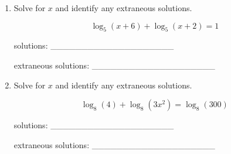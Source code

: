 \documentclass[11pt]{article}
\begin{document}
\begin{enumerate}
{{solutions: \(\boxed{ -1 }\)

extraneous solutions: \(\boxed{ \text{none} }\)

}
}

\newpage

% 

\item %
\providecommand{\stxKnowl}{}\renewcommand{\stxKnowl}[1]{#1}
\providecommand{\stxOuttro}{}\renewcommand{\stxOuttro}[1]{#1}
\providecommand{\stxTitle}{}\renewcommand{\stxTitle}[1]{#1}
\renewcommand{\stxOuttro}[1]{}
\stxKnowl{
Solve for \(x\) and identify any extraneous solutions.

\[\log_{5}(x + 6) + \log_{5}(x + 2) = 1\]

solutions: ____________________

extraneous solutions: ____________________

\stxOuttro{
Solution

\[\begin{aligned} \log_{5}((x + 6)(x + 2)) &= 1 \\ 5 &= (x + 6)(x + 2) \\ 5 &= x^{2} + 8 \, x + 12 \\ 0 &= x^{2} + 8 \, x + 7 \\ 0 &= (x + 1)(x + 7) \end{aligned}\]

 \(x = -1\) is a valid solution, while \(x = -7\) causes a non-positive argument in the original logarithms. 

solutions: \(\boxed{ x = -1 }\)

extraneous solutions: \(\boxed{ x = -7 }\)

}
}

\newpage

% 

\item %
\providecommand{\stxKnowl}{}\renewcommand{\stxKnowl}[1]{#1}
\providecommand{\stxOuttro}{}\renewcommand{\stxOuttro}[1]{#1}
\providecommand{\stxTitle}{}\renewcommand{\stxTitle}[1]{#1}
\renewcommand{\stxOuttro}[1]{}
\stxKnowl{
Solve for \(x\) and identify any extraneous solutions.

\[\log_{8}(4) + \log_{8}(3x^2) = \log_{8}(300)\]

solutions: ____________________

extraneous solutions: ____________________

}
\end{enumerate}
\end{document}
